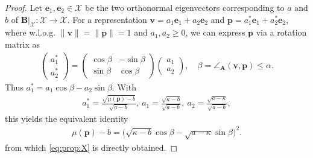 \documentclass[a4paper,11pt,oneside]{amsart}
\theoremstyle{definition}
\theoremstyle{remark}
\newcommand{\ten}[1]{\boldsymbol{#1}}
\numberwithin{equation}{section}
\numberwithin{theorem}{section}
\begin{document}
\begin{appendix}
\begin{proof}
 Let  $\ten e_1, \ten e_2 \in \mathcal{X}$ be the two orthonormal eigenvectors corresponding to $a$ and $b$ of $\ten B|_\mathcal{X}: \mathcal{X} \rightarrow \mathcal{X}$. For a representation $\ten v = a_1 \ten e_1 + a_2 \ten e_2$ and $\ten p = a^\ast_1 \ten e_1 + a^\ast_2 \ten e_2$, where w.l.o.g. $\|\ten v\| = \|\ten p\| = 1$ and $a_1,a_2 \geq 0$, we can express $\ten p$ via a rotation matrix as
\begin{align*}
 \begin{pmatrix}
  a^\ast_1 \\ a^\ast_2
 \end{pmatrix}
 =
 \begin{pmatrix}
  \cos \beta & -\sin \beta \\
  \sin \beta & \cos \beta
 \end{pmatrix}
  \begin{pmatrix}
  a_1 \\ a_2
 \end{pmatrix}, \quad \beta = \angle_{\ten A}(\ten v,\ten p) \leq \alpha.
\end{align*}
Thus $a_1^\ast = a_1 \cos \beta - a_2 \sin \beta$.
With 
\begin{align}\label{eq:a12ast}
    a_1^\ast = \frac{\sqrt{\mu(\ten p)-b}}{\sqrt{a - b}}, \ a_1 = \frac{\sqrt{\kappa-b}}{\sqrt{a - b}}, \ a_2 = \frac{\sqrt{a -\kappa}}{\sqrt{a - b}},
\end{align}
this yields the equivalent identity
\begin{align}\label{func:f}
 \mu(\ten p) - b = \bigl(\sqrt{\kappa-b} \cos \beta- \sqrt{a-\kappa} \sin\beta \bigr)^2.
%
%
%
\end{align}
from which \cref{eq:prop:X} is directly obtained.
%
%
%
%
%
%
%
%
%
%
%
\end{proof}


\end{appendix}
\end{document}
